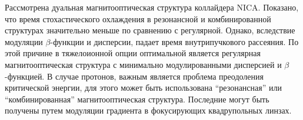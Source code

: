 \par Рассмотрена дуальная магнитооптическая структура коллайдера NICA. Показано, что время стохастического охлаждения в резонансной и комбинированной структурах значительно меньше по сравнению с регулярной. Однако, вследствие модуляции $\beta$-функции и дисперсии, падает время внутрипучкового рассеяния. По этой причине в тяжелоионной опции оптимальной является регулярная магнитооптическая структура с минимально модулированными дисперсией и $\beta$-функцией. В случае протонов, важным является проблема преодоления критической энергии, для этого может быть использована “резонансная” или “комбинированная” магнитооптическая структура. Последние могут быть получены путем модуляции градиента в фокусирующих квадрупольных линзах.

\FloatBarrier

